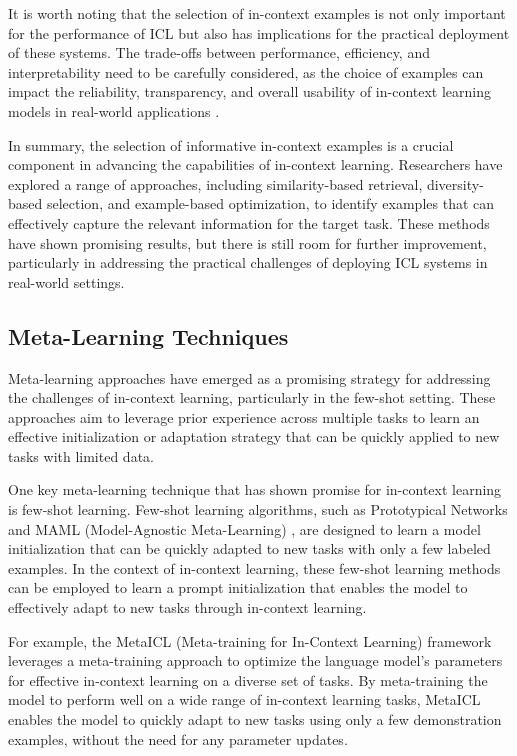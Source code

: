 \documentclass[11pt]{article}
\begin{document}
It is worth noting that the selection of in-context examples is not only important for the performance of ICL but also has implications for the practical deployment of these systems. The trade-offs between performance, efficiency, and interpretability need to be carefully considered, as the choice of examples can impact the reliability, transparency, and overall usability of in-context learning models in real-world applications \cite{ref13}.

In summary, the selection of informative in-context examples is a crucial component in advancing the capabilities of in-context learning. Researchers have explored a range of approaches, including similarity-based retrieval, diversity-based selection, and example-based optimization, to identify examples that can effectively capture the relevant information for the target task. These methods have shown promising results, but there is still room for further improvement, particularly in addressing the practical challenges of deploying ICL systems in real-world settings.

\subsection{Meta-Learning Techniques}

Meta-learning approaches have emerged as a promising strategy for addressing the challenges of in-context learning, particularly in the few-shot setting. These approaches aim to leverage prior experience across multiple tasks to learn an effective initialization or adaptation strategy that can be quickly applied to new tasks with limited data.

One key meta-learning technique that has shown promise for in-context learning is few-shot learning. Few-shot learning algorithms, such as Prototypical Networks \cite{ref79} and MAML (Model-Agnostic Meta-Learning) \cite{ref80}, are designed to learn a model initialization that can be quickly adapted to new tasks with only a few labeled examples. In the context of in-context learning, these few-shot learning methods can be employed to learn a prompt initialization that enables the model to effectively adapt to new tasks through in-context learning.

For example, the MetaICL (Meta-training for In-Context Learning) framework \cite{ref81} leverages a meta-training approach to optimize the language model's parameters for effective in-context learning on a diverse set of tasks. By meta-training the model to perform well on a wide range of in-context learning tasks, MetaICL enables the model to quickly adapt to new tasks using only a few demonstration examples, without the need for any parameter updates.
\end{document}
